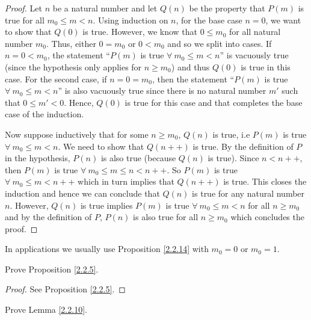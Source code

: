 \begin{proof}
    Let \(n\) be a natural number and let \(Q(n)\) be the property that \(P(m)\) is true for all \(m_0 \leq m < n\).
    Using induction on \(n\), for the base case \(n = 0\), we want to show that \(Q(0)\) is true.
    However, we know that \(0 \leq m_0\) for all natural number \(m_0\).
    Thus, either \(0 = m_0\) or \(0 < m_0\) and so we split into cases.
    If \(n = 0 < m_0\), the statement ``\(P(m)\) is true \(\forall\ m_0 \leq m < n\)'' is vacuously true (since the hypothesis only applies for \(n \geq m_0\)) and thus \(Q(0)\) is true in this case.
    For the second case, if \(n = 0 = m_0\), then the statement ``\(P(m)\) is true \(\forall\ m_0 \leq m < n\)'' is also vacuously true since there is no natural number \(m'\) such that \(0 \leq m' < 0\). Hence, \(Q(0)\) is true for this case and that completes the base case of the induction.

    Now suppose inductively that for some \(n \geq m_0\), \(Q(n)\) is true, i.e \(P(m)\) is true \(\forall\ m_0 \leq m < n\).
    We need to show that \(Q(n++)\) is true.
    By the definition of \(P\) in the hypothesis, \(P(n)\) is also true (because \(Q(n)\) is true).
    Since \(n < n++\), then \(P(m)\) is true \(\forall\ m_0 \leq m \leq n < n++\).
    So \(P(m)\) is true \(\forall\ m_0 \leq m < n++\) which in turn implies that \(Q(n++)\) is true.
    This closes the induction and hence we can conclude that \(Q(n)\) is true for any natural number \(n\).
    However, \(Q(n)\) is true implies \(P(m)\) is true \(\forall\ m_0 \leq m < n\) for all \(n \geq m_0\) and by the definition of \(P\), \(P(n)\) is also true for all \(n \geq m_0\) which concludes the proof.
\end{proof}

\begin{remark}\label{2.2.15}
    In applications we usually use Proposition \ref{2.2.14} with \(m_0 = 0\) or \(m_0 = 1\).
\end{remark}

\exercisesection

\begin{exercise}\label{ex 2.2.1}
    Prove Proposition \ref{2.2.5}.
\end{exercise}

\begin{proof}
    See Proposition \ref{2.2.5}.
\end{proof}

\begin{exercise}\label{ex 2.2.2}
    Prove Lemma \ref{2.2.10}.
\end{exercise}

